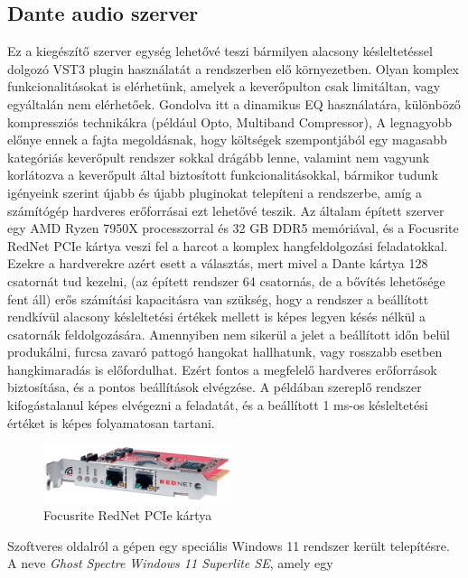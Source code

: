 \subsection{Dante audio szerver}
Ez a kiegészítő szerver egység lehetővé teszi bármilyen alacsony késleltetéssel dolgozó VST3 plugin használatát a rendszerben elő környezetben.
Olyan komplex funkcionalitásokat is elérhetünk, amelyek a keverőpulton csak limitáltan, vagy egyáltalán nem elérhetőek.
Gondolva itt a dinamikus EQ használatára, különböző kompressziós technikákra (például Opto, Multiband Compressor), 
A legnagyobb előnye ennek a fajta megoldásnak, hogy költségek szempontjából egy magasabb kategóriás keverőpult rendszer sokkal drágább lenne,
valamint nem vagyunk korlátozva a keverőpult által biztosított funkcionalitásokkal, bármikor tudunk igényeink szerint újabb és újabb pluginokat
telepíteni a rendszerbe, amíg a számítógép hardveres erőforrásai ezt lehetővé teszik.
Az általam épített szerver egy AMD Ryzen 7950X processzorral és 32 GB DDR5 memóriával, és a Focusrite RedNet PCIe kártya veszi fel a harcot a
komplex hangfeldolgozási feladatokkal. Ezekre a hardverekre azért esett a választás, mert mivel a Dante kártya 128 csatornát tud kezelni, 
(az épített rendszer 64 csatornás, de a bővítés lehetősége fent áll) erős számítási kapacitásra van szükség, hogy a rendszer a beállított rendkívül alacsony
késleltetési értékek mellett is képes legyen késés nélkül a csatornák feldolgozására. Amennyiben nem sikerül a jelet a beállított időn belül
produkálni, furcsa zavaró pattogó hangokat hallhatunk, vagy rosszabb esetben hangkimaradás is előfordulhat. Ezért fontos a megfelelő hardveres
erőforrások biztosítása, és a pontos beállítások elvégzése.
A példában szereplő rendszer kifogástalanul képes elvégezni a feladatát, és a beállított 1 ms-os késleltetési értéket is képes folyamatosan tartani.
\begin{figure}[H]
	\centering
	\includegraphics[width=55mm, keepaspectratio]{figures/rednet_pcie.jpg}
	\caption{Focusrite RedNet PCIe kártya}\label{fig:rednet_pcie}
\end{figure}
Szoftveres oldalról a gépen egy speciális Windows 11 rendszer került telepítésre. A neve \textit{Ghost Spectre Windows 11 Superlite SE}, amely egy
